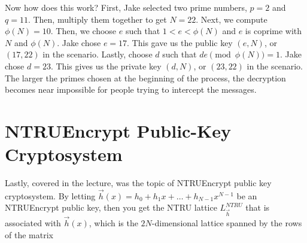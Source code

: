\documentclass[12pt]{article}
\begin{document}
Now how does this work? First, Jake selected two prime numbers, $p = 2$ and $q = 11$. Then, multiply them together to get $N = 22$. Next, we compute $\phi(N) = 10$. Then, we choose $e$ such that $1 < e < \phi(N)$ and $e$ is coprime with $N$ and $\phi(N)$. Jake chose $e = 17$. This gave us the public key $(e,N)$, or $(17,22)$ in the scenario. Lastly, choose $d$ such that $de \pmod{\phi(N)} = 1$. Jake chose $d = 23$. This gives us the private key $(d,N)$, or $(23,22)$ in the scenario. The larger the primes chosen at the beginning of the process, the decryption becomes near impossible for people trying to intercept the messages.

\section{NTRUEncrypt Public-Key Cryptosystem}

\hspace{1em} Lastly, covered in the lecture, was the topic of NTRUEncrypt public key cryptosystem. By letting $\vec{h}(x) = h_0 + h_1x + \dots + h_{N-1}x^{N-1}$ be an NTRUEncrypt public key, then you get the NTRU lattice $L_{\vec{h}}^{NTRU}$ that is associated with $\vec{h}(x)$, which is the $2N$-dimensional lattice spanned by the rows of the matrix 
  
\end{document}
